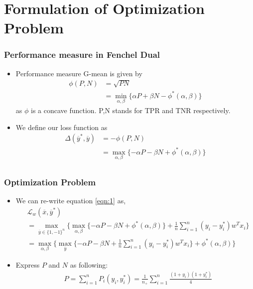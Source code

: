 \documentclass{beamer}
\begin{document}
\section{Formulation of Optimization Problem}
\begin{frame}
	\frametitle{Performance measure in Fenchel Dual}
	\begin{itemize}
	\item Performance measure G-mean is given by
	\begin{align*}
		\phi(P,N) &=\sqrt{PN}\\
		& = \min_{\alpha,\beta}\{\alpha P+\beta N - \phi^*(\alpha,\beta)\}
	\end{align*}
	as $\phi$ is a concave function. P,N stands for TPR and TNR respectively.
	\item We define our loss function as
	\begin{align*}
		\Delta(\overline{y}^*,\overline{y}) &= -\phi(P,N) \\
		&= \max_{\alpha,\beta}\{-\alpha P-\beta N + \phi^*(\alpha,\beta)\}\\
	\end{align*}
	\end{itemize}
\end{frame}


\begin{frame}
	\frametitle{Optimization Problem}
	\begin{itemize}
	\item We can re-write equation \ref{eqn:1} as,
	\begin{align}
	\label{eqn:2}
	&\mathcal L_w(\overline{x},\overline{y}^*)\nonumber\\
	&=\max_{\overline{y}\in\{1,-1\}^n}\{\max_{\alpha,\beta}\{-\alpha P-\beta N +\phi^*(\alpha,\beta)\} + \frac{1}{n}\sum_{i=1}^n (y_i - y_i^*)w^Tx_i\}\nonumber\\
	&=\max_{\alpha,\beta}\{\max_{\overline{y}}\{-\alpha P-\beta N  + \frac{1}{n}\sum_{i=1}^n (y_i - y_i^*)w^Tx_i\}+\phi^*(\alpha,\beta)\}
	\end{align}
	\item Express $P$ and $N$ as following:
	\begin{align*}
	&P = \sum_{i=1}^nP_i(y_i,y_i^*)= \frac{1}{n_+}\sum_{i=1}^n\frac{(1+y_i)(1+y_i^*)}{4}
	\end{align*}
	\end{itemize}
\end{frame}
\end{document}
